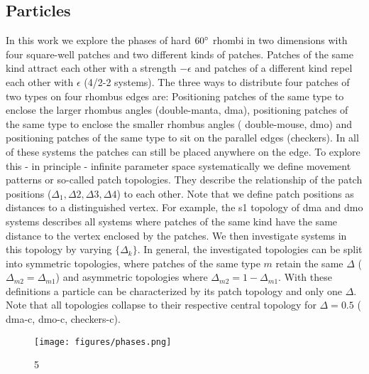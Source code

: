 \documentclass[a4paper,twocolumn]{revtex4}
\begin{document}
\subsection{Particles}
In this work we explore the phases of hard $60\degree$ rhombi in two dimensions with four square-well patches and two different kinds of patches.
Patches of the same kind attract each other with a strength $-\epsilon$ and patches of a different kind repel each other 
with $\epsilon$ (4/2-2 systems).
The three ways to distribute four patches of two types on four rhombus edges are:
Positioning patches of the same type to enclose the larger rhombus angles (double-manta, dma), positioning patches of the same type to enclose the smaller rhombus angles ( double-mouse, dmo) and 
positioning patches of the same type to sit on the parallel edges (checkers).
In all of these systems the patches can still be placed anywhere on the edge.
To explore this - in principle - infinite parameter space systematically we define movement patterns or so-called patch topologies. 
They describe the relationship of the patch positions ($\Delta_{1}, \Delta{2}, \Delta{3}, \Delta{4}$) to each other. 
Note that we define patch positions as distances to a distinguished vertex.
For example, the s1 topology of dma and dmo systems describes all systems where patches of the same kind have the same distance 
to the vertex enclosed by the patches.
We then investigate systems in this topology by varying $\{\Delta_{k}\}$.
In general, the investigated topologies can be split into symmetric topologies, where patches of the same type $m$ retain the same $\Delta$ ($\Delta_{m2} = \Delta_{m1}$) and asymmetric topologies where $\Delta_{m2} = 1 - \Delta_{m1}$.
With these definitions a particle can be characterized by its patch topology and only one $\Delta$.
Note that all topologies collapse to their respective central topology for $\Delta = 0.5$ ( dma-c, dmo-c, checkers-c). 


\begin{figure*}
\begin{center} 
\texttt{[image: figures/phases.png]}
\caption{}5
\label{fig:phases}
\end{center} 
\end{figure*}

\end{document}

